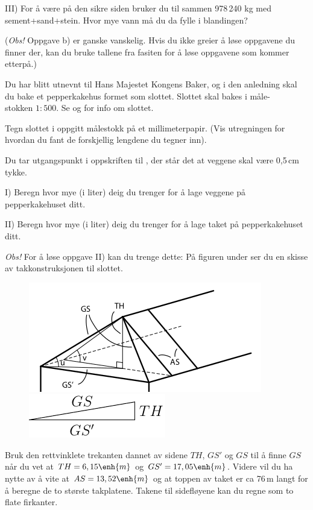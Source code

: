 III) For å være på den sikre siden bruker du til sammen 978\,240 kg med sement+sand+stein. Hvor mye vann må du da fylle i blandingen?


(\textsl{Obs!} Oppgave b)  er ganske vanskelig. Hvis du ikke greier å løse oppgavene du finner der, kan du bruke tallene fra fasiten for å løse oppgavene som kommer etterpå.)\vsk

Du har blitt utnevnt til Hans Majestet Kongens Baker, og i den anledning skal du bake et pepperkakehus formet som slottet. Slottet skal bakes i måle-\\stokken $ {1:500} $.
Se  og  for info om slottet.\vsk

\ab Tegn slottet i oppgitt målestokk på et millimeterpapir. (Vis utregningen for hvordan du fant de forskjellig lengdene du tegner inn). \vsk

\ab Du tar utgangspunkt i oppskriften til
, der står det at veggene skal være 0,5\,cm tykke.\os

I) Beregn hvor mye (i liter) deig du trenger for å lage veggene på pepperkakehuset ditt.\os

II) Beregn hvor mye (i liter) deig du trenger for å lage taket på pepperkakehuset ditt.\os

\textsl{Obs!} For å løse oppgave II) kan du trenge dette:  
På figuren under ser du en skisse av takkonstruksjonen til slottet. 
\begin{figure}
	\centering
	\includegraphics[scale=0.6]{valt}\quad\includegraphics[scale=1]{fig/gs}
\end{figure}
Bruk den rettvinklete trekanten dannet av sidene $ TH $, $ GS' $ og $ GS $ til å finne $ GS $ når du vet at $ {TH=6,15\enh{m}} $ og $ {GS'=17,05\enh{m}} $.\os 
Videre vil du ha nytte av å vite at  $ {AS = 13,52\enh{m}} $ og at toppen av taket er ca 76\,m langt for å beregne de to største takplatene. Takene til sidefløyene kan du regne som to flate firkanter.\vsk
 
